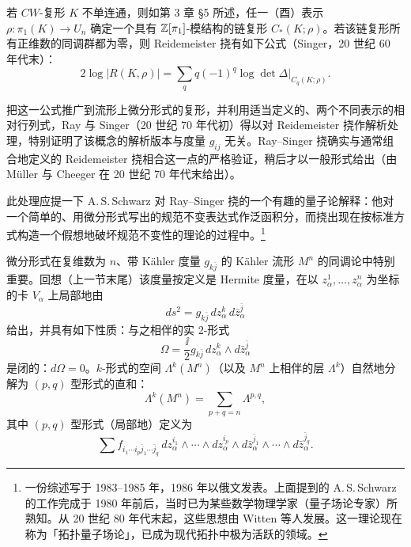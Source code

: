 若 $CW$-复形 $K$ 不单连通，则如第 3 章 §5 所述，任一（酉）表示 $\rho:\pi_1(K)\to U_n$ 确定一个具有 $\mathbb{Z}[\pi_1]$-模结构的链复形 $C_*(K;\rho)$。若该链复形所有正维数的同调群都为零，则 Reidemeister 挠有如下公式（Singer，20 世纪 60 年代末）：
\begin{equation}
  2\log|R(K,\rho)|=\sum_q q(-1)^q\log\det\Delta|_{C_q(K;\rho)}. \tag{2.26}
\end{equation}

把这一公式推广到流形上微分形式的复形，并利用适当定义的、两个不同表示的相对行列式，Ray 与 Singer（20 世纪 70 年代初）得以对 Reidemeister 挠作解析处理，特别证明了该概念的解析版本与度量 $g_{ij}$ 无关。Ray--Singer 挠确实与通常组合地定义的 Reidemeister 挠相合这一点的严格验证，稍后才以一般形式给出（由 Müller 与 Cheeger 在 20 世纪 70 年代末给出）。

此处理应提一下 A.\,S.\,Schwarz 对 Ray--Singer 挠的一个有趣的量子论解释：他对一个简单的、用微分形式写出的规范不变表达式作泛函积分，而挠出现在按标准方式构造一个假想地破坏规范不变性的理论的过程中。\footnote{一份综述写于 1983--1985 年，1986 年以俄文发表。上面提到的 A.\,S.\,Schwarz 的工作完成于 1980 年前后，当时已为某些数学物理学家（量子场论专家）所熟知。从 20 世纪 80 年代末起，这些思想由 Witten 等人发展。这一理论现在称为「拓扑量子场论」，已成为现代拓扑中极为活跃的领域。}

微分形式在复维数为 $n$、带 Kähler 度量 $g_{k\bar j}$ 的 Kähler 流形 $M^n$ 的同调论中特别重要。回想（上一节末尾）该度量按定义是 Hermite 度量，在以 $z_\alpha^1,\ldots,z_\alpha^n$ 为坐标的卡 $V_\alpha$ 上局部地由
\[
  ds^2=g_{k\bar j}\,dz_\alpha^k\,d\bar z_\alpha^{\bar j}
\]
给出，并具有如下性质：与之相伴的实 2-形式
\[
  \Omega=\frac{\ii}{2}g_{k\bar j}\,dz_\alpha^k\wedge d\bar z_\alpha^{\bar j}
\]
是闭的：$d\Omega=0$。$k$-形式的空间 $\Lambda^k(M^n)$（以及 $M^n$ 上相伴的层 $\Lambda^k$）自然地分解为 $(p,q)$ 型形式的直和：
\begin{equation}
  \Lambda^k(M^n)=\sum_{p+q=n}\Lambda^{p,q}, \tag{2.27}
\end{equation}
其中 $(p,q)$ 型形式（局部地）定义为
\begin{equation}
  \sum f_{i_1\cdots i_p\bar j_1\cdots\bar j_q}\,
  dz_\alpha^{i_1}\wedge\cdots\wedge dz_\alpha^{i_p}\wedge
  d\bar z_\alpha^{\bar j_1}\wedge\cdots\wedge d\bar z_\alpha^{\bar j_q}. \tag{2.28}
\end{equation}

